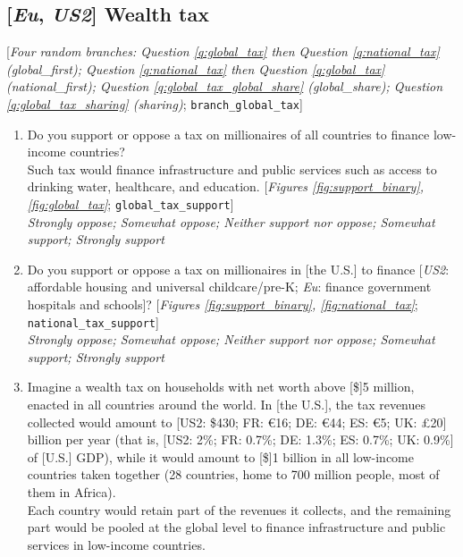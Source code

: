 \subsection*{[\textit{Eu}, \textit{US2}] Wealth tax}
[\textit{Four random branches: Question \ref{q:global_tax} then Question \ref{q:national_tax} (global\_first); Question \ref{q:national_tax} then Question \ref{q:global_tax} (national\_first); Question \ref{q:global_tax_global_share} (global\_share); Question \ref{q:global_tax_sharing} (sharing)}; \verb|branch_global_tax|] 
\begin{enumerate}[resume] 
    \item  \label{q:global_tax} Do you support or oppose a tax on millionaires of all countries to finance low-income countries? \\
    Such tax would finance infrastructure and public services such as access to drinking water, healthcare, and education. [\textit{Figures \ref{fig:support_binary}, \ref{fig:global_tax}}; \verb|global_tax_support|]
   \\ \textit{Strongly oppose; Somewhat oppose; Neither support nor oppose; Somewhat support; Strongly support}
   \item  \label{q:national_tax} Do you support or oppose a tax on millionaires in [the U.S.] to finance [\textit{US2}: affordable housing and universal childcare/pre-K; \textit{Eu}: finance government hospitals and schools]?  [\textit{Figures \ref{fig:support_binary},  \ref{fig:national_tax}}; \verb|national_tax_support|]
  \\ \textit{Strongly oppose; Somewhat oppose; Neither support nor oppose; Somewhat support; Strongly support}
  \item  \label{q:global_tax_global_share} Imagine a wealth tax on households with net worth above [\$]5 million, enacted in all countries around the world.  
  In [the U.S.], the tax revenues collected would amount to [US2: \$430; FR: \euro{}16; DE: \euro{}44; ES: \euro{}5; UK: £20] billion per year (that is, [US2: 2\%; FR: 0.7\%; DE: 1.3\%; ES: 0.7\%; UK: 0.9\%] of [U.S.] GDP), while it would amount to [\$]1 billion in all low-income countries taken together (28 countries, home to 700 million people, most of them in Africa).  \\
  Each country would retain part of the revenues it collects, and the remaining part would be pooled at the global level to finance infrastructure and public services in low-income countries.  \\
     \\

\end{enumerate}
